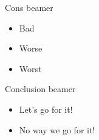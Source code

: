 \documentclass[
  11pt,
  aspectratio=169]{beamer}
\providecommand{\tightlist}{%
  \setlength{\itemsep}{0pt}\setlength{\parskip}{0pt}}
\begin{document}
\begin{frame}{Cons beamer}
\label{cons-beamer}
\begin{itemize}
\tightlist
\item
  Bad
\item
  Worse
\item
  Worst
\end{itemize}
\end{frame}

\begin{frame}{Conclusion beamer}
\label{conclusion-beamer}
\begin{itemize}
\tightlist
\item
  Let's go for it!
\item
  No way we go for it!
\end{itemize}
\end{frame}
\end{document}
